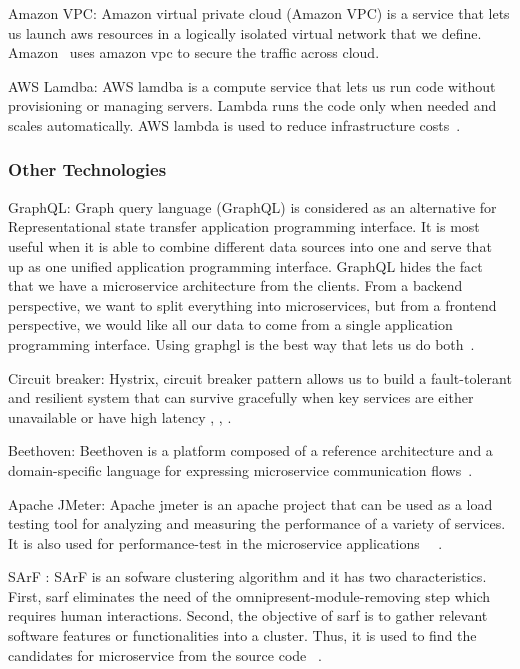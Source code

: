 \par Amazon VPC: Amazon virtual private cloud (Amazon VPC) is a service that lets us launch aws resources in a logically isolated virtual network that we define. Amazon~\cite{Amazon} uses amazon vpc to secure the traffic across cloud.

\par AWS Lamdba: AWS lamdba is a compute service that lets us run code without provisioning or managing servers. Lambda runs the code only when needed and scales automatically. AWS lambda is used to reduce infrastructure costs~\cite{villamizar2017}.

\subsubsection{Other Technologies}

\par GraphQL: Graph query language (GraphQL) is considered as an alternative for Representational state transfer application programming interface. It is most useful when it is able to combine different data sources into one and serve that up as one unified application programming interface. GraphQL hides the fact that we have a microservice architecture from the clients. From a backend perspective, we want to split everything into microservices, but from a frontend perspective, we would like all our data to come from a single application programming interface. Using graphgl is the best way that lets us do both~\cite{Ghebremicael2017, wang2020, overeem2018, gozneli2020}.

\par Circuit breaker: Hystrix, circuit breaker pattern allows us to build a fault-tolerant and resilient system that can survive gracefully when key services are either unavailable or have high latency \cite{Kalske2017paper}, \cite{Rodrigue2016}, \cite{Uber}. 

\par Beethoven: Beethoven is a platform composed of a reference architecture and a domain-specific language for expressing microservice communication flows~\cite{Monteiro2020}.

\par Apache JMeter: Apache jmeter is an apache project that can be used as a load testing tool for analyzing and measuring the performance of a variety of services. It is also used for performance-test in the microservice applications ~\cite{Hou2019}~\cite{Johansson2019}.

\par SArF : SArF is an sofware clustering algorithm and it has two characteristics. First, sarf eliminates the need of the omnipresent-module-removing step which requires human interactions. Second, the objective of sarf is to gather relevant software features or functionalities into a cluster. Thus, it is used to find the candidates for microservice from the source code ~\cite{Kamimura2018}.

